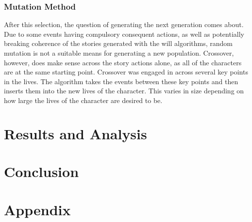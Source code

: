 \documentclass[11pt]{article}
\begin{document}
\subsubsection{Mutation Method}
After this selection, the question of generating the next generation comes about. Due to some events having compulsory consequent actions, as well as potentially breaking coherence of the stories generated with the will algorithms, random mutation is not a suitable means for generating a new population. Crossover, however, does make sense across the story actions alone, as all of the characters are at the same starting point. Crossover was engaged in across several key points in the lives. The algorithm takes the events between these key points and then inserts them into the new lives of the character. This varies in size depending on how large the lives of the character are desired to be. 


\section{Results and Analysis}

\section{Conclusion}


\printbibliography

\section{Appendix}
\end{document}
